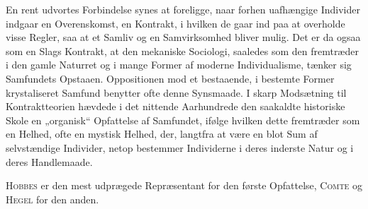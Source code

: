 \documentclass[12pt]{article}
\newcommand{\opage}[1]{\marginnote{\footnotesize\textit{[#1]}}}
\begin{document}
En rent udvortes Forbindelse synes at foreligge, naar forhen uafhængige Individer
indgaar en Overenskomst, en Kontrakt, i hvilken de gaar ind paa at overholde
visse Regler, saa at et Samliv og en Samvirksomhed bliver mulig. Det er da ogsaa
som en Slags Kontrakt, at den mekaniske Sociologi, saaledes som den fremtræder i
den gamle Naturret og i mange Former af moderne Individualisme, tænker sig
Samfundets Opstaaen. Oppositionen mod et bestaaende, i bestemte Former
krystaliseret Samfund benytter ofte denne Synsmaade. I skarp Modsætning til
Kontraktteorien hævdede i det nittende Aarhundrede den saakaldte historiske Skole
en „organisk“ Opfattelse af Samfundet, ifølge hvilken dette fremtræder som en
Helhed, ofte en
\setcounter{footnote}{0}%
\opage{60}mystisk Helhed, der, langtfra at være en blot Sum af selvstændige Individer, netop
bestemmer Individerne i deres inderste Natur og i deres Handlemaade.

\textsc{Hobbes} er den mest udprægede Repræsentant for den første Opfattelse,
\textsc{Comte} og \textsc{Hegel} for den anden.
\end{document}
